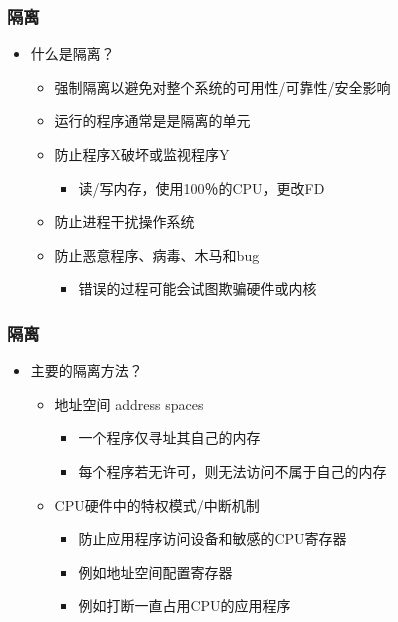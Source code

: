 \begin{frame}
	\frametitle{隔离}
	\begin{itemize}
		\item 什么是隔离？
		\begin{itemize}

		\item 强制隔离以避免对整个系统的可用性/可靠性/安全影响
		\item 运行的程序通常是是隔离的单元
		\item 防止程序X破坏或监视程序Y
			\begin{itemize}
			\item 读/写内存，使用100％的CPU，更改FD
			\end{itemize}
		\item 防止进程干扰操作系统
		\item 防止恶意程序、病毒、木马和bug
			\begin{itemize}
			\item 错误的过程可能会试图欺骗硬件或内核
			\end{itemize}
		\end{itemize}
	\end{itemize}
\end{frame}



\begin{frame}
	\frametitle{隔离}
	\begin{itemize}
		\item 主要的隔离方法？
		\begin{itemize}
			\item 地址空间 address spaces
				\begin{itemize}
				\item 一个程序仅寻址其自己的内存
				\item 每个程序若无许可，则无法访问不属于自己的内存
				\end{itemize}			
			
			\item CPU硬件中的特权模式/中断机制
				\begin{itemize}
				\item 防止应用程序访问设备和敏感的CPU寄存器
				\item 例如地址空间配置寄存器
				\item 例如打断一直占用CPU的应用程序
				\end{itemize}				
		\end{itemize}
	\end{itemize}
\end{frame}

